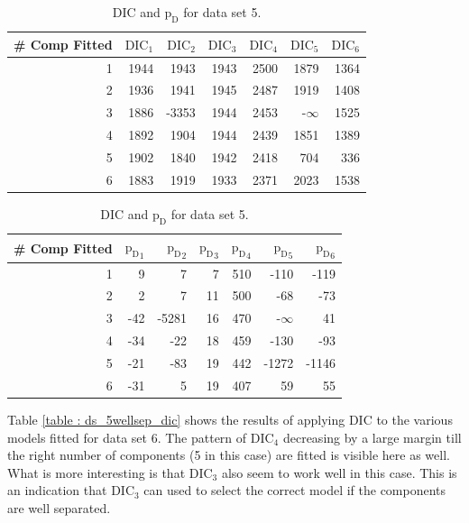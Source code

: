 \begin{table}[!htb]
\centering
\caption{DIC and $\text{p}_\text{D}$ for data set 5.}
\label{table : ds_3fused_3ppg_dic}
\begin{tabular}{@{}rrrrrrr@{}}
\toprule
\# Comp Fitted & $\text{DIC}_1$ & $\text{DIC}_2$  & $\text{DIC}_3$  & $\text{DIC}_4$  & $\text{DIC}_5$  & $\text{DIC}_6$  \\ \midrule
1 & 1944 & 1943 & 1943 & 2500 & 1879 & 1364 \\
2 & 1936 & 1941 & 1945 & 2487 & 1919 & 1408 \\
3 & 1886 & -3353 & 1944 & 2453 & -$\infty$ & 1525 \\
4 & 1892 & 1904 & 1944 & 2439 & 1851 & 1389 \\
5 & 1902 & 1840 & 1942 & 2418 & 704 & 336 \\
6 & 1883 & 1919 & 1933 & 2371 & 2023 & 1538 \\ \bottomrule
\end{tabular}

\begin{tabular}{@{}rrrrrrr@{}}
\toprule
\# Comp Fitted & ${\text{p}_\text{D}}_1$ & ${\text{p}_\text{D}}_2$ & ${\text{p}_\text{D}}_3$ & ${\text{p}_\text{D}}_4$ & ${\text{p}_\text{D}}_5$ & ${\text{p}_\text{D}}_6$ \\ \midrule
1 & 9 & 7 & 7 & 510 & -110 & -119 \\
2 & 2 & 7 & 11 & 500 & -68 & -73 \\
3 & -42 & -5281 & 16 & 470 & -$\infty$ & 41 \\
4 & -34 & -22 & 18 & 459 & -130 & -93 \\
5 & -21 & -83 & 19 & 442 & -1272 & -1146 \\
6 & -31 & 5 & 19 & 407 & 59 & 55 \\ \bottomrule
\end{tabular}
\end{table}

Table \ref{table : ds_5wellsep_dic} shows the results of applying DIC to the various models fitted for data set 6. The pattern of $\text{DIC}_4$ decreasing by a large margin till the right number of components (5 in this case) are fitted is visible here as well. What is more interesting is that $\text{DIC}_3$ also seem to work well in this case. This is an indication that $\text{DIC}_3$ can used to select the correct model if the components are well separated.\\


